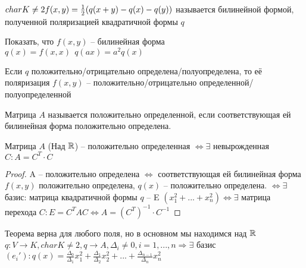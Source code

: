 \begin{Def} 
	$char K \neq 2\\
	f(x,y) = \frac{1}{2} (q(x+y) - q(x) - q(y))$ называется билинейной формой, полученной поляризацией квадратичной формы $q$
\end{Def} 

\begin{Ex}
	Показать, что $f(x, y)$ -- билинейная форма\\
	$q(x) = f(x,x) \ \ q(ax) = a^2 q(x)$
\end{Ex}

\begin{Def} 
	Если $q$ положительно/отрицательно определена/полуопределена, то её поляризация $f(x, y)$ -- положительно/отрицательно определенной/полуопределенной 
\end{Def} 

\begin{Def}
	Матрица $A$ называется положительно определенной, если соответствующая ей билинейная форма положительно определена. 
\end{Def}

\begin{Thm} 
	Матрица $A$ (Над $\mathbb{R}$) -- положительно определенная $\Leftrightarrow \exists$ невырожденная $C: A = C^T \cdot C$
\end{Thm} 

\begin{proof}
	A -- положительно определена $\Leftrightarrow$ соответствующая ей билинейная форма $f(x,y)$ положительно определена,  $q(x)$ -- положительно определена.
	$\Leftrightarrow \exists$ базис: матрица квадратичной формы $q$ -- E $(x^2_1 + ... + x^2_n) \Leftrightarrow \exists$ матрица перехода $C: E = C^TAC \Leftrightarrow A = (C^T)^{-1} \cdot C^{-1}$ 
\end{proof}

\begin{Thm} 
	Теорема верна для любого поля, но в основном мы находимся над $\mathbb{R}$\\
	$q: V \to K, char K \neq 2, q \to A, \Delta_i \neq 0, i = 1, ..., n  \Rightarrow \exists$ базис $(e_i'): q(x) = \frac{\Delta_0}{\Delta_1} x_1^2 + \frac{\Delta_1}{\Delta_2} x_2^2 + ... + \frac{\Delta_{n-1}}{\Delta_n} x^2_n$\\
\end{Thm} 

